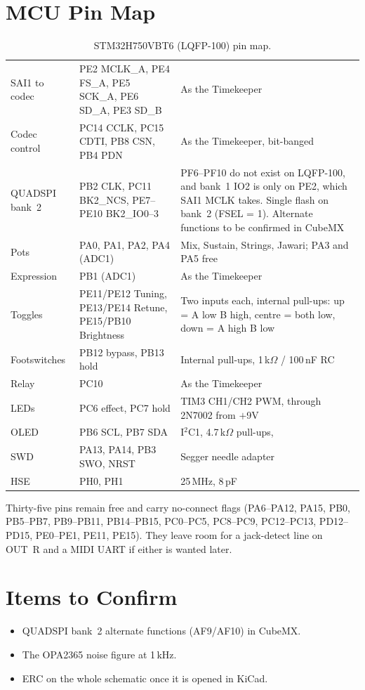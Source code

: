 \section{MCU Pin Map}\label{sec:pinmap}
\begin{table}[H]
  \small\renewcommand{\arraystretch}{1.12}
  \caption{STM32H750VBT6 (LQFP-100) pin map.}\label{tab:pinmap}
  \begin{tabularx}{\textwidth}{@{}>{\raggedright\arraybackslash}p{28mm} >{\raggedright\arraybackslash}p{48mm} L@{}}
    \toprule
     &  &  \\
    \midrule
    SAI1 to codec & PE2 MCLK\_A, PE4 FS\_A, PE5 SCK\_A, PE6 SD\_A, PE3 SD\_B & As the Timekeeper \\
    Codec control & PC14 CCLK, PC15 CDTI, PB8 CSN, PB4 PDN & As the Timekeeper, bit-banged \\
    QUADSPI bank~2 & PB2 CLK, PC11 BK2\_NCS, PE7--PE10 BK2\_IO0--3 & PF6--PF10 do not exist on LQFP-100, and bank~1 IO2 is only on PE2, which SAI1 MCLK takes. Single flash on bank~2 (FSEL = 1). Alternate functions to be confirmed in CubeMX \\
    Pots & PA0, PA1, PA2, PA4 (ADC1) & Mix, Sustain, Strings, Jawari; PA3 and PA5 free \\
    Expression & PB1 (ADC1) & As the Timekeeper \\
    Toggles & PE11/PE12 Tuning, PE13/PE14 Retune, PE15/PB10 Brightness & Two inputs each, internal pull-ups: up = A low B high, centre = both low, down = A high B low \\
    Footswitches & PB12 bypass, PB13 hold & Internal pull-ups, 1\,k$\Omega$ / 100\,nF RC \\
    Relay & PC10 & As the Timekeeper \\
    LEDs & PC6 effect, PC7 hold & TIM3 CH1/CH2 PWM, through 2N7002 from $+$9V \\
    OLED & PB6 SCL, PB7 SDA & I$^2$C1, 4.7\,k$\Omega$ pull-ups,  \\
    SWD & PA13, PA14, PB3 SWO, NRST & Segger needle adapter \\
    HSE & PH0, PH1 & 25\,MHz, 8\,pF \\
    \bottomrule
  \end{tabularx}
\end{table}

Thirty-five pins remain free and carry no-connect flags (PA6--PA12, PA15, PB0, PB5--PB7, PB9--PB11, PB14--PB15, PC0--PC5, PC8--PC9, PC12--PC13, PD12--PD15, PE0--PE1, PE11, PE15). They leave room for a jack-detect line on OUT~R and a MIDI UART if either is wanted later.

\section{Items to Confirm}
\begin{itemize}
  \item QUADSPI bank~2 alternate functions (AF9/AF10) in CubeMX.
  \item The OPA2365 noise figure at 1\,kHz.
  \item ERC on the whole schematic once it is opened in KiCad.
\end{itemize}
